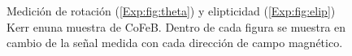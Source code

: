 \begin{figure}[!hbt]
	\centering
 \caption[Hit\'eresis de $\theta_k$ y $\eta_k$ en CoFeB]{Medici\'on de rotaci\'on (\ref{Exp:fig:theta}) y elipticidad (\ref{Exp:fig:elip}) Kerr enuna muestra de CoFeB. Dentro de cada figura se muestra en cambio de la se\~nal medida con cada direcci\'on de campo magn\'etico.}
 \label{Exp:fig:Kerrhis}
  
\end{figure}
\newline
